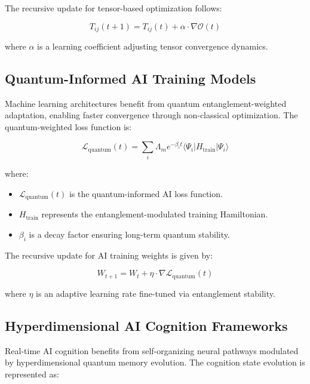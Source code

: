 \documentclass{article}
\theoremstyle{plain}
\begin{document}
The recursive update for tensor-based optimization follows:

\begin{equation}
    T_{ij}(t+1) = T_{ij}(t) + \alpha \cdot \nabla \mathcal{O}(t)
\end{equation}

where $\alpha$ is a learning coefficient adjusting tensor convergence dynamics.

\subsection{Quantum-Informed AI Training Models}

Machine learning architectures benefit from quantum entanglement-weighted adaptation, enabling faster convergence through non-classical optimization. The quantum-weighted loss function is:

\begin{equation}
    \mathcal{L}_{\text{quantum}}(t) = \sum_{i} \Lambda_m e^{-\beta_i t} \langle \Psi_i | H_{\text{train}} | \Psi_i \rangle
\end{equation}

where:
\begin{itemize}
    \item $\mathcal{L}_{\text{quantum}}(t)$ is the quantum-informed AI loss function.
    \item $H_{\text{train}}$ represents the entanglement-modulated training Hamiltonian.
    \item $\beta_i$ is a decay factor ensuring long-term quantum stability.
\end{itemize}

The recursive update for AI training weights is given by:

\begin{equation}
    W_{t+1} = W_t + \eta \cdot \nabla \mathcal{L}_{\text{quantum}}(t)
\end{equation}

where $\eta$ is an adaptive learning rate fine-tuned via entanglement stability.

\subsection{Hyperdimensional AI Cognition Frameworks}

Real-time AI cognition benefits from self-organizing neural pathways modulated by hyperdimensional quantum memory evolution. The cognition state evolution is represented as:
\end{document}
